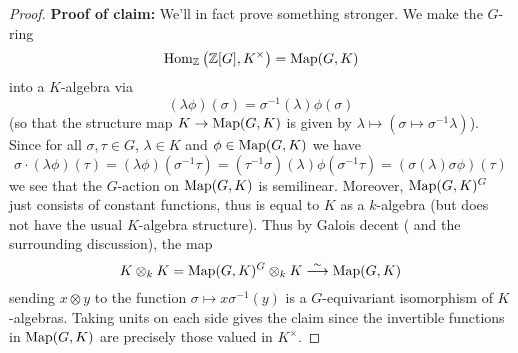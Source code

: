 \documentclass[11pt]{amsart}
\numberwithin{equation}{section}
\theoremstyle{remark}
\theoremstyle{remark}
\theoremstyle{remark}
\theoremstyle{definition}
\theoremstyle{definition}
\theoremstyle{definition}
\theoremstyle{definition}
\theoremstyle{definition}
\theoremstyle{definition}
\begin{document}
\begin{proof}
\textbf{Proof of claim:}
We'll in fact prove something stronger. We make the $G$-ring
\[\textup{Hom}_{\mathbb{Z}}\left(\mathbb{Z}[G],K^\times\right)=\textup{Map}(G,K)\]
into a $K$-algebra via
\[(\lambda\phi)(\sigma)=\sigma^{-1}(\lambda)\phi(\sigma)\]
(so that the structure map $K\rightarrow  \textup{Map}(G,K)$ is given by $\lambda \mapsto (\sigma \mapsto \sigma^{-1}\lambda)$). Since for all $\sigma, \tau \in G$, $\lambda \in K$ and $\phi \in\textup{Map}(G,K)$  we have
\[\sigma \cdot (\lambda\phi)(\tau)=(\lambda\phi)(\sigma^{-1}\tau)=(\tau^{-1}\sigma)(\lambda)\phi(\sigma^{-1}\tau)=(\sigma(\lambda)\sigma\phi)(\tau)\]
we see that the $G$-action on $\textup{Map}(G,K)$ is semilinear. Moreover,  $\textup{Map}(G,K)^G$ just consists of constant functions, thus is equal to $K$ as a $k$-algebra (but does not have the usual $K$-algebra structure). Thus by Galois decent ( and the surrounding discussion), the map
\[K\otimes_k K =\textup{Map}(G,K)^G\otimes_k K \stackrel{\sim}{\longrightarrow}  \textup{Map}(G,K)\]
sending $x\otimes y$ to the function $\sigma \mapsto x\sigma^{-1}(y)$ is a $G$-equivariant isomorphism of $K$-algebras. Taking units on each side gives the claim since the invertible functions in $\textup{Map}(G,K)$ are precisely those valued in $K^\times$.
%
%
%

\end{proof}
\end{document}
